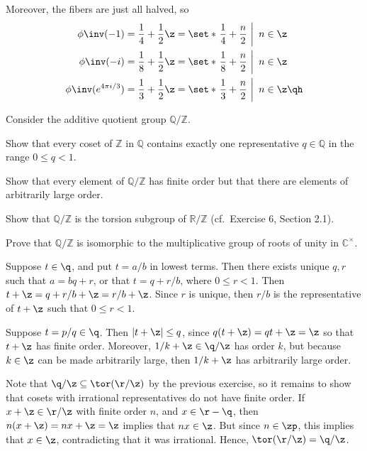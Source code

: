 \begin{problems}
\begin{sol}
\begin{center}
        \end{center}
        Moreover, the fibers are just all halved, so
        \begin{align*}
            \phi\inv(-1) & = \frac14 + \frac12 \z = \set*{\left.\frac14 + \frac n2~\right|~n \in \z} \\
            \phi\inv(-i) & = \frac18 + \frac12 \z = \set*{\left.\frac18 + \frac n2~\right|~n \in \z} \\
            \phi\inv(e^{4\pi i/3}) & = \frac13 + \frac12 \z = \set*{\left.\frac13 + \frac n2~\right|~n \in \z} \qh
        \end{align*}
    \end{sol}
    \item Consider the additive quotient group $\mathbb{Q}/\mathbb{Z}$.
    \begin{problems}
        \item Show that every coset of $\mathbb{Z}$ in $\mathbb{Q}$ contains exactly one representative $q \in \mathbb{Q}$ in the range $0 \le q < 1$.
        \item Show that every element of $\mathbb{Q}/\mathbb{Z}$ has finite order but that there are elements of arbitrarily large order.
        \item Show that $\mathbb{Q}/\mathbb{Z}$ is the torsion subgroup of $\mathbb{R}/\mathbb{Z}$ (cf.\ Exercise 6, Section 2.1).
        \item Prove that $\mathbb{Q}/\mathbb{Z}$ is isomorphic to the multiplicative group of roots of unity in $\mathbb{C}^\times$.
    \end{problems}
    \begin{solalph}
        \item Suppose $t \in \q$, and put $t = a/b$ in lowest terms. Then there exists unique $q, r$ such that $a = bq + r$, or that $t = q + r/b$, where $0 \leq r < 1$. Then $t + \z = q + r/b + \z = r/b + \z$. Since $r$ is unique, then $r/b$ is the representative of $t + \z$ such that $0 \leq r < 1$.
        \item Suppose $t = p/q \in \q$. Then $|t + \z| \leq q$, since $q(t + \z) = qt + \z = \z$ so that $t + \z$ has finite order. Moreover, $1/k + \z \in \q/\z$ has order $k$, but because $k \in \z$ can be made arbitrarily large, then $1/k + \z$ has arbitrarily large order.
        \item Note that $\q/\z \subseteq \tor(\r/\z)$ by the previous exercise, so it remains to show that cosets with irrational representatives do not have finite order. If $x + \z \in \r/\z$ with finite order $n$, and $x \in \r - \q$, then $n(x + \z) = nx + \z = \z$ implies that $nx \in \z$. But since $n \in \zp$, this implies that $x \in \z$, contradicting that it was irrational. Hence, $\tor(\r/\z) = \q/\z$.

\end{solalph}
\end{problems}
